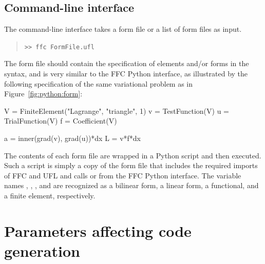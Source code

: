 \subsection{Command-line interface}

The command-line interface takes a \ufl{} form file or a list of form
files as input.
\begin{quote}
\texttt{>> ffc FormFile.ufl}
\end{quote}
The form file should contain the specification of elements and/or
forms in the~\ufl{} syntax, and is very similar to the FFC Python
interface, as illustrated by the following specification of the same
variational problem as in Figure~\ref{fig:python:form}:
\begin{python}
V = FiniteElement("Lagrange", "triangle", 1)
v = TestFunction(V)
u = TrialFunction(V)
f = Coefficient(V)

a = inner(grad(v), grad(u))*dx
L = v*f*dx
\end{python}
The contents of each form file are wrapped in a Python script
and then executed. Such a script is simply a copy of the form file
that includes the required imports of FFC and UFL and calls
 or  from the FFC
Python interface. The variable names , ,
, and  are recognized as a bilinear form,
a linear form, a functional, and a finite element, respectively.

\section{Parameters affecting code generation}

